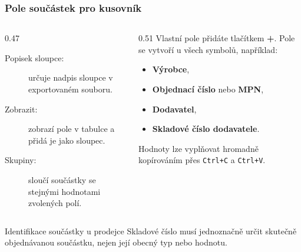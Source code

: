 \documentclass{beamer}
\begin{document}
\begin{frame}
	\frametitle{Pole součástek pro kusovník}
	\small
	\begin{columns}[T]
		\begin{column}{0.47\textwidth}
			\begin{description}
        \item[Popisek sloupce:] určuje nadpis sloupce v exportovaném souboru.
				\item[Zobrazit:] zobrazí pole v tabulce a přidá je jako sloupec.
				\item[Skupiny:] sloučí součástky se stejnými hodnotami zvolených polí.
			\end{description}
		\end{column}
		\begin{column}{0.51\textwidth}
			Vlastní pole přidáte tlačítkem \textbf{+}. Pole se vytvoří u všech symbolů, například:
			\begin{itemize}
				\item \textbf{Výrobce},
				\item \textbf{Objednací číslo} nebo \textbf{MPN},
				\item \textbf{Dodavatel},
				\item \textbf{Skladové číslo dodavatele}.
			\end{itemize}

			Hodnoty lze vyplňovat hromadně kopírováním přes \texttt{Ctrl+C} a \texttt{Ctrl+V}.
		\end{column}
	\end{columns}

	\medskip
  \begin{alertblock}{Identifikace součástky u prodejce}
		Skladové číslo musí jednoznačně určit skutečně objednávanou součástku, nejen její obecný typ nebo hodnotu.
	\end{alertblock}
\end{frame}
\end{document}
